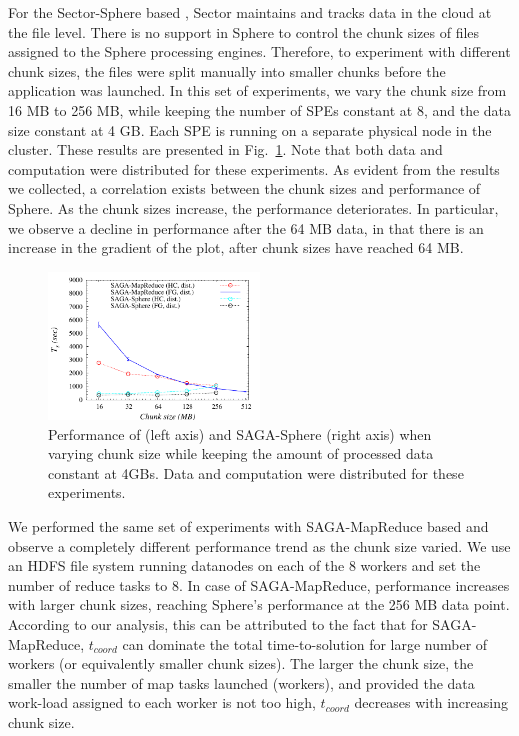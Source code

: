 \documentclass[3p,twocolumn]{elsarticle}
\begin{document}
For the Sector-Sphere based \wc, Sector maintains and tracks data in
the cloud at the file level. There is no support in Sphere to control
the chunk sizes of files assigned to the Sphere processing
engines. Therefore, to experiment with different chunk sizes, the
files were split manually into smaller chunks before the \wc
application was launched. In this set of experiments, we vary the
chunk size from 16 MB to 256 MB, while keeping the number of SPEs
constant at 8, and the data size constant at 4 GB. Each SPE is running
on a separate physical node in the cluster. These results are
presented in Fig.~\ref{fig:sphere_mr_chunksize}.  Note that both data
and computation were distributed for these experiments.  As evident
from the results we collected, a correlation exists between the chunk
sizes and performance of Sphere.  As the chunk sizes increase, the
performance deteriorates. In particular, we observe a decline in
performance after the 64 MB data, in that there is an increase in the
gradient of the plot, after chunk sizes have reached 64 MB.


\begin{figure}[htb!]
 \includegraphics[width=0.5\textwidth]{figures/sphere_mr_varying_chunksize.pdf}
 \caption{
   Performance of \sagamapreduce (left axis) and
   SAGA-Sphere (right axis) when varying chunk size while keeping the amount
   of processed data constant at 4GBs. Data and computation were
   distributed for these experiments.
   \label{fig:sphere_mr_chunksize}
   }
\end{figure}

We performed the same set of experiments with SAGA-MapReduce based \wc
and observe a completely different performance trend as the chunk size
varied.  We use an HDFS file system running datanodes on each of the 8
workers and set the number of reduce tasks to 8.  In case of
SAGA-MapReduce, performance increases with larger chunk sizes,
reaching Sphere's performance at the 256 MB data point.  According to
our analysis, this can be attributed to the fact that for
SAGA-MapReduce, $t_{coord}$ can dominate the total time-to-solution
for large number of workers (or equivalently smaller chunk sizes).
The larger the chunk size, the smaller the number of map tasks
launched (workers), and provided the data work-load assigned to each
worker is not too high, $t_{coord}$ decreases with increasing chunk
size.
\end{document}
